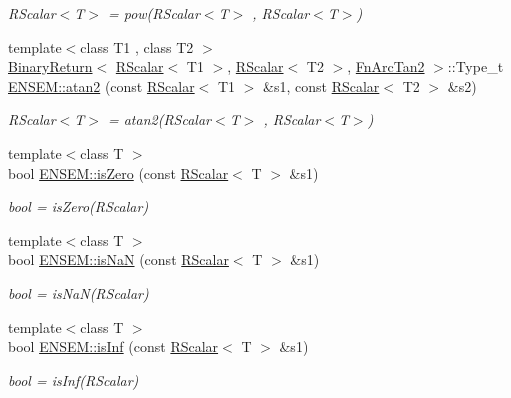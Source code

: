 \begin{DoxyCompactItemize}
\begin{DoxyCompactList}\small\item\em R\+Scalar$<$\+T$>$ = pow(\+R\+Scalar$<$\+T$>$ , R\+Scalar$<$\+T$>$) \end{DoxyCompactList}\item 
{\footnotesize template$<$class T1 , class T2 $>$ }\\\mbox{\hyperlink{structENSEM_1_1BinaryReturn}{Binary\+Return}}$<$ \mbox{\hyperlink{classENSEM_1_1RScalar}{R\+Scalar}}$<$ T1 $>$, \mbox{\hyperlink{classENSEM_1_1RScalar}{R\+Scalar}}$<$ T2 $>$, \mbox{\hyperlink{structENSEM_1_1FnArcTan2}{Fn\+Arc\+Tan2}} $>$\+::Type\+\_\+t \mbox{\hyperlink{group__rscalar_ga855c0e6f402b471f9ddfc04245e0b910}{E\+N\+S\+E\+M\+::atan2}} (const \mbox{\hyperlink{classENSEM_1_1RScalar}{R\+Scalar}}$<$ T1 $>$ \&s1, const \mbox{\hyperlink{classENSEM_1_1RScalar}{R\+Scalar}}$<$ T2 $>$ \&s2)
\begin{DoxyCompactList}\small\item\em R\+Scalar$<$\+T$>$ = atan2(\+R\+Scalar$<$\+T$>$ , R\+Scalar$<$\+T$>$) \end{DoxyCompactList}\item 
{\footnotesize template$<$class T $>$ }\\bool \mbox{\hyperlink{group__rscalar_gad963fef363cb9cc2ca365a068821a5ff}{E\+N\+S\+E\+M\+::is\+Zero}} (const \mbox{\hyperlink{classENSEM_1_1RScalar}{R\+Scalar}}$<$ T $>$ \&s1)
\begin{DoxyCompactList}\small\item\em bool = is\+Zero(\+R\+Scalar) \end{DoxyCompactList}\item 
{\footnotesize template$<$class T $>$ }\\bool \mbox{\hyperlink{group__rscalar_ga831d3981e39b262a19f78641d8b770c3}{E\+N\+S\+E\+M\+::is\+NaN}} (const \mbox{\hyperlink{classENSEM_1_1RScalar}{R\+Scalar}}$<$ T $>$ \&s1)
\begin{DoxyCompactList}\small\item\em bool = is\+Na\+N(\+R\+Scalar) \end{DoxyCompactList}\item 
{\footnotesize template$<$class T $>$ }\\bool \mbox{\hyperlink{group__rscalar_ga01c23e87027a8c43440f812a0693b62f}{E\+N\+S\+E\+M\+::is\+Inf}} (const \mbox{\hyperlink{classENSEM_1_1RScalar}{R\+Scalar}}$<$ T $>$ \&s1)
\begin{DoxyCompactList}\small\item\em bool = is\+Inf(\+R\+Scalar) \end{DoxyCompactList}\item 

\end{DoxyCompactItemize}
